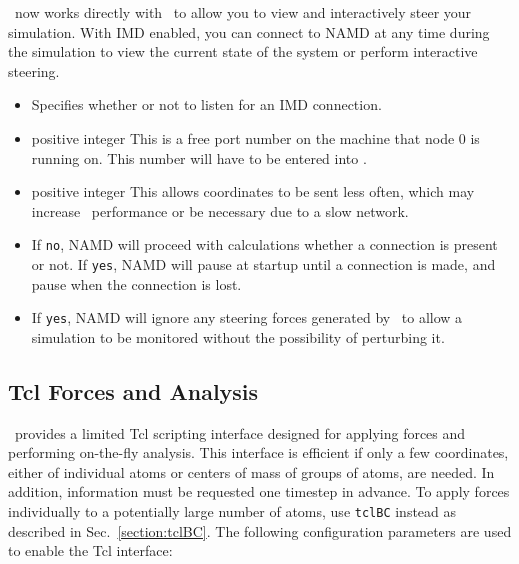 \NAMD\ now works directly with \VMD\ to allow you to view and interactively
steer your simulation.  With IMD enabled, you can connect to NAMD at any
time during the simulation to view the current state of the system or perform
interactive steering. 

\begin{itemize}
\item
{}
{Specifies whether or not to listen for an IMD connection.}

\item
{}
{positive integer}
{This is a free port number on the machine that node 0 is running on.
This number will have to be entered into \VMD.}

\item
{}
{positive integer}
{This allows coordinates to be sent less often, which may increase
\NAMD\ performance or be necessary due to a slow network.}

\item 
{}
{If {\tt no}, NAMD will proceed with calculations whether a connection is
present or not.  If {\tt yes}, NAMD will pause at startup until a connection is
made, and pause when the connection is lost.}

\item 
{}
{If {\tt yes}, NAMD will ignore any steering forces generated by \VMD\ to allow
a simulation to be monitored without the possibility of perturbing it.}

\end{itemize}


\subsection{Tcl Forces and Analysis}

\NAMD\ provides a limited Tcl scripting interface designed for applying forces and performing on-the-fly analysis.
This interface is efficient if only a few coordinates, either of individual atoms or centers of mass of groups of atoms, are needed.
In addition, information must be requested one timestep in advance.
To apply forces individually to a potentially large number of atoms, use
{\tt tclBC} instead as described in Sec.~\ref{section:tclBC}.
The following configuration parameters are used to enable the Tcl interface:

